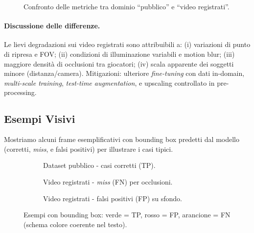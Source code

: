 \documentclass[12pt,a4paper,openright,twoside]{book}
\begin{document}
\begin{figure}[t]
  \centering
  \caption{Confronto delle metriche tra dominio ``pubblico'' e ``video registrati''.}
  \label{fig:domain_gap_bar}
\end{figure}

\paragraph{Discussione delle differenze.}
Le lievi degradazioni sui video registrati sono attribuibili a: (i) variazioni di punto di ripresa e FOV; 
(ii) condizioni di illuminazione variabili e motion blur; (iii) maggiore densità di occlusioni tra giocatori; 
(iv) scala apparente dei soggetti minore (distanza/camera). 
Mitigazioni: ulteriore \emph{fine-tuning} con dati in-domain, \emph{multi-scale training}, \emph{test-time augmentation}, 
e upscaling controllato in pre-processing.

\subsection{Esempi Visivi}
Mostriamo alcuni frame esemplificativi con bounding box predetti dal modello (corretti, \emph{miss}, 
e falsi positivi) per illustrare i casi tipici.

\begin{figure}[t]
  \centering
  \begin{subfigure}{0.32\linewidth}
    \caption{Dataset pubblico - casi corretti (TP).}
  \end{subfigure}\hfill
  \begin{subfigure}{0.32\linewidth}
    \caption{Video registrati - \emph{miss} (FN) per occlusioni.}
  \end{subfigure}\hfill
  \begin{subfigure}{0.32\linewidth}
    \caption{Video registrati - falsi positivi (FP) su sfondo.}
  \end{subfigure}
  \caption{Esempi con bounding box: verde = TP, rosso = FP, arancione = FN (schema colore coerente nel testo).}
  \label{fig:visual_examples}
\end{figure}
\end{document}

